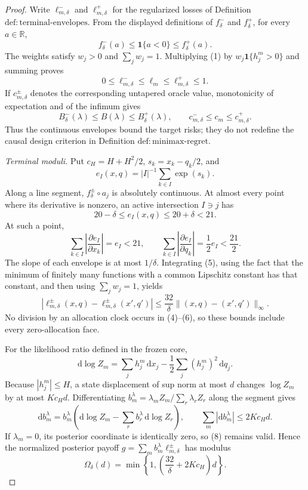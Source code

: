 \documentclass{article}
\begin{document}
\begin{proof}
Write \(\ell_{m,\delta}^-\) and \(\ell_{m,\delta}^+\) for the regularized losses of Definition \(\mathrm{def{:}terminal\text{-}envelopes}\).  From the displayed definitions of \(f_\delta^-\) and \(f_\delta^+\), for every \(a\in\mathbb R\),
\[
 f_\delta^-(a)\leq\mathbf 1\{a<0\}\leq f_\delta^+(a).
 \tag{1}
\]
The weights satisfy \(w_j>0\) and \(\sum_jw_j=1\).  Multiplying (1) by \(w_j\mathbf 1\{h_j^m>0\}\) and summing proves
\[
 0\leq\ell_{m,\delta}^-\leq\ell_m\leq
 \ell_{m,\delta}^+\leq1.
 \tag{2}
\]
If \(c_{m,\delta}^\pm\) denotes the corresponding untapered oracle value, monotonicity of expectation and of the infimum gives
\[
 B_\delta^-(\lambda)\leq B(\lambda)\leq B_\delta^+(\lambda),
 \qquad
 c_{m,\delta}^-\leq c_m\leq c_{m,\delta}^+.
 \tag{3}
\]
Thus the continuous envelopes bound the target risks; they do not redefine the causal design criterion in Definition \(\mathrm{def{:}minimax\text{-}regret}\).

\emph{Terminal moduli.}
Put \(c_H=H+H^2/2\), \(s_k=x_k-q_k/2\), and
\[
 e_I(x,q)=|I|^{-1}\sum_{k\in I}\exp(s_k).
\]
Along a line segment, \(f_\delta^\pm\circ a_j\) is absolutely continuous.  At almost every point where its derivative is nonzero, an active intersection \(I\ni j\) has
\[
 20-\delta\leq e_I(x,q)\leq20+\delta<21.
 \tag{4}
\]
At such a point,
\[
 \sum_{k\in I}\left|\frac{\partial e_I}{\partial x_k}\right|=e_I<21,
 \qquad
 \sum_{k\in I}\left|\frac{\partial e_I}{\partial q_k}\right|=\frac12e_I<\frac{21}{2}.
 \tag{5}
\]
The slope of each envelope is at most \(1/\delta\).  Integrating (5), using the fact that the minimum of finitely many functions with a common Lipschitz constant has that constant, and then using \(\sum_jw_j=1\), yields
\[
 |\ell_{m,\delta}^\pm(x,q)-\ell_{m,\delta}^\pm(x',q')|
 \leq\frac{32}{\delta}\|(x,q)-(x',q')\|_\infty.
 \tag{6}
\]
No division by an allocation clock occurs in (4)--(6), so these bounds include every zero-allocation face.

For the likelihood ratio defined in the frozen core,
\[
 \mathrm d\log Z_m
 =\sum_jh_j^m\,\mathrm dx_j-\frac12\sum_j(h_j^m)^2\,\mathrm dq_j.
 \tag{7}
\]
Because \(|h_j^m|\leq H\), a state displacement of sup norm at most \(d\) changes \(\log Z_m\) by at most \(Kc_Hd\).  Differentiating
\(b_m^\lambda=\lambda_mZ_m/\sum_r\lambda_rZ_r\) along the segment gives
\[
 \mathrm db_m^\lambda=b_m^\lambda\left(\mathrm d\log Z_m-
 \sum_rb_r^\lambda\,\mathrm d\log Z_r\right),
 \qquad
 \sum_m|\mathrm db_m^\lambda|\leq2Kc_Hd.
 \tag{8}
\]
If \(\lambda_m=0\), its posterior coordinate is identically zero, so (8) remains valid.  Hence the normalized posterior payoff
\(g=\sum_mb_m^\lambda\ell_{m,\delta}^\pm\) has modulus
\[
 \Omega_\delta(d)=
 \min\!\left\{1,\left(\frac{32}{\delta}+2Kc_H\right)d\right\}.
 \tag{9}
\]


\end{proof}
\end{document}
